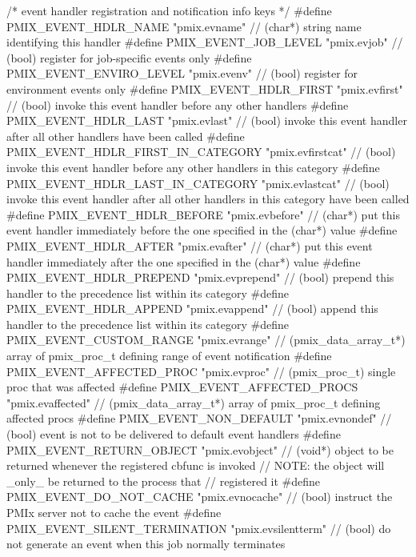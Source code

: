 \begin{codepar}
/* event handler registration and notification info keys */
#define PMIX_EVENT_HDLR_NAME                "pmix.evname"           // (char*) string name identifying this handler
#define PMIX_EVENT_JOB_LEVEL                "pmix.evjob"            // (bool) register for job-specific events only
#define PMIX_EVENT_ENVIRO_LEVEL             "pmix.evenv"            // (bool) register for environment events only
#define PMIX_EVENT_HDLR_FIRST               "pmix.evfirst"          // (bool) invoke this event handler before any other handlers
#define PMIX_EVENT_HDLR_LAST                "pmix.evlast"           // (bool) invoke this event handler after all other handlers have been called
#define PMIX_EVENT_HDLR_FIRST_IN_CATEGORY   "pmix.evfirstcat"       // (bool) invoke this event handler before any other handlers in this category
#define PMIX_EVENT_HDLR_LAST_IN_CATEGORY    "pmix.evlastcat"        // (bool) invoke this event handler after all other handlers in this category have been called
#define PMIX_EVENT_HDLR_BEFORE              "pmix.evbefore"         // (char*) put this event handler immediately before the one specified in the (char*) value
#define PMIX_EVENT_HDLR_AFTER               "pmix.evafter"          // (char*) put this event handler immediately after the one specified in the (char*) value
#define PMIX_EVENT_HDLR_PREPEND             "pmix.evprepend"        // (bool) prepend this handler to the precedence list within its category
#define PMIX_EVENT_HDLR_APPEND              "pmix.evappend"         // (bool) append this handler to the precedence list within its category
#define PMIX_EVENT_CUSTOM_RANGE             "pmix.evrange"          // (pmix_data_array_t*) array of pmix_proc_t defining range of event notification
#define PMIX_EVENT_AFFECTED_PROC            "pmix.evproc"           // (pmix_proc_t) single proc that was affected
#define PMIX_EVENT_AFFECTED_PROCS           "pmix.evaffected"       // (pmix_data_array_t*) array of pmix_proc_t defining affected procs
#define PMIX_EVENT_NON_DEFAULT              "pmix.evnondef"         // (bool) event is not to be delivered to default event handlers
#define PMIX_EVENT_RETURN_OBJECT            "pmix.evobject"         // (void*) object to be returned whenever the registered cbfunc is invoked
                                                                    //     NOTE: the object will _only_ be returned to the process that
                                                                    //           registered it
#define PMIX_EVENT_DO_NOT_CACHE             "pmix.evnocache"        // (bool) instruct the PMIx server not to cache the event
#define PMIX_EVENT_SILENT_TERMINATION       "pmix.evsilentterm"     // (bool) do not generate an event when this job normally terminates



\end{codepar}
